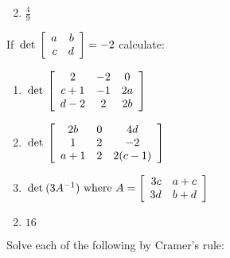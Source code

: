 \begin{multicols}{2}
\begin{ex}
\begin{enumerate}[label={\alph*.}]
\end{enumerate}
\begin{sol}
\begin{enumerate}[label={\alph*.}]
\setcounter{enumi}{1}
\item $\frac{4}{9}$


\end{enumerate}
\end{sol}
\end{ex}

\begin{ex}
If $\thinspace\operatorname{det\medspace} \left[ \begin{array}{rr}
a & b \\
c& d 
\end{array}\right] = -2$
 calculate:


\begin{enumerate}[label={\alph*.}]
\item $ \thinspace\operatorname{det\medspace} \left[ \begin{array}{ccc}
2 & -2 & 0 \\
c+1 & -1 & 2a \\
d-2 & 2 & 2b 
\end{array}\right]$


\item  $ \thinspace\operatorname{det\medspace} \left[ \begin{array}{ccc}
2b & 0 & 4d \\
1 & 2 & -2 \\
a+1 & 2 & 2(c-1) 
\end{array}\right]$


\item $\thinspace\operatorname{det\medspace}(3A^{-1}) \mbox{ where } A = \left[ \begin{array}{rr}
3c & a+c \\
3d & b+d 
\end{array}\right]$


\end{enumerate}
\begin{sol}
\begin{enumerate}[label={\alph*.}]
\setcounter{enumi}{1}
\item  $16$

\end{enumerate}
\end{sol}
\end{ex}

\begin{ex}
Solve each of the following by Cramer's rule:


\end{ex}
\end{multicols}
